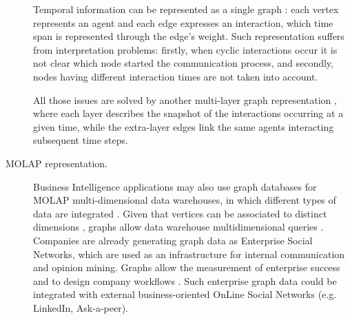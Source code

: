 \begin{description}
	Temporal information can be represented as a single graph \cite{Wu}: 
	each vertex represents an agent and each edge expresses an interaction, which time span is represented through the edge's weight. Such representation suffers from interpretation problems: firstly, when cyclic
	interactions occur it is not clear which node started the communication process, and secondly,
	 nodes  having different interaction times are not taken into account.
	
	All those issues are
	solved by another multi-layer graph representation \cite{Kostakos2008}, where each layer describes the snapshot
	of the interactions occurring at a given time, while the extra-layer edges link the same agents interacting
	subsequent time steps.
	
\item[MOLAP representation.] \label{molap} %
Business Intelligence applications may also use %
graph databases for  %
MOLAP multi-dimensional  data warehouses, in which different types of data are %
integrated \cite{Petermann2014,SoussiAZ11}. Given that vertices can be associated to distinct dimensions \cite{PterMicBergami}, graphs allow
data warehouse multidimensional queries  \cite{ChenYZHY08,Zhao11,Etcheverry2012a}. Companies are already
generating graph data as Enterprise Social Networks, which are used as an infrastructure for internal communication and
opinion mining. Graphs allow the measurement of enterprise
success \cite{success} and to design company workflows \cite{Park2016355}. 
Such enterprise graph data could be integrated with  external business-oriented OnLine Social Networks (e.g. LinkedIn, Ask-a-peer).

\end{description}
